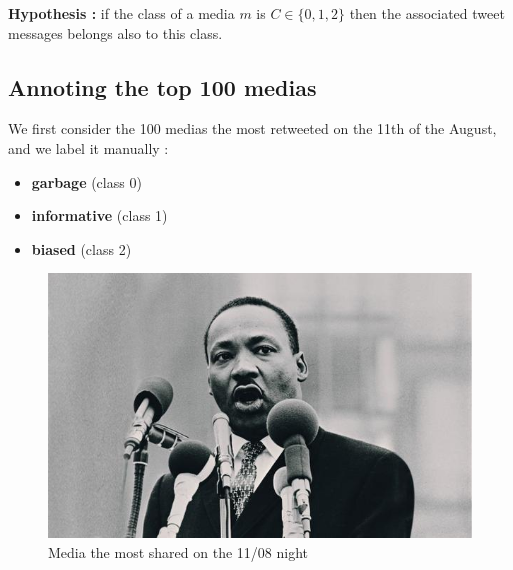\documentclass[a4paper,12pt]{report}
\begin{document}
\textbf{Hypothesis :} if the class of a media $m$ is $C \in \{0,1,2\}$ then the associated tweet messages belongs also to this class.

\subsection{Annoting the top 100 medias}
We first consider the 100 medias the most retweeted on the 11th of the August, and we label it manually :
\begin{itemize}
\item \textbf{garbage} (class 0)
\item \textbf{informative} (class 1)
\item \textbf{biased} (class 2)
\end{itemize}

\begin{figure}[H]
\begin{minipage}[t]{0.45\textwidth}
\begin{center}
	\includegraphics[width=\textwidth]{images/photos/mlk.jpg}
	\caption{Media the most shared on the 11/08 night}
\end{center}
\end{minipage}
\hfill
\begin{minipage}[t]{0.4\textwidth}
\begin{center}

\end{center}
\end{minipage}
\end{figure}
\end{document}
